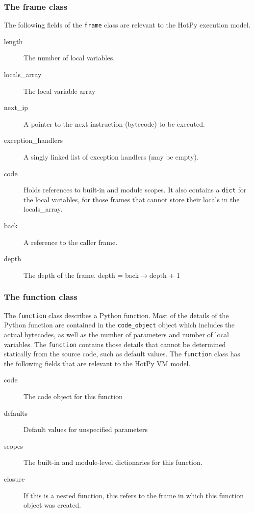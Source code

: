 \subsubsection{The frame class}

The following fields of the \verb|frame| class are relevant to the HotPy execution model.
\begin{description}
\item[length] The number of local variables.
\item[locals\_array] The local variable array
\item[next\_ip] A pointer to the next instruction (bytecode) to be executed.
\item[exception\_handlers]  A singly linked list of exception handlers (may be empty).
\item[code] Holds references to built-in and module scopes.
It also contains a \verb|dict| for the local variables, for those frames that cannot store their locals in the locals\_array.
\item[back] A reference to the caller frame.
\item[depth] The depth of the frame. depth = back$\rightarrow$depth + 1
\end{description}

\subsubsection{The function class}

The \verb|function| class describes a Python function. Most of the details of the Python function are contained in the \verb|code_object| object which includes the actual bytecodes, as well as the number of parameters and number of local variables. The \verb|function| contains those details that cannot be determined statically from the source code, such as default values.
The \verb|function| class has the following fields that are relevant to the HotPy VM model.
\begin{description}
\item[code] The code object for this function
\item[defaults] Default values for unspecified parameters
\item[scopes] The built-in and module-level dictionaries for this function.
\item[closure] If this is a nested function, this refers to the frame in which this function object was created.
\end{description}

